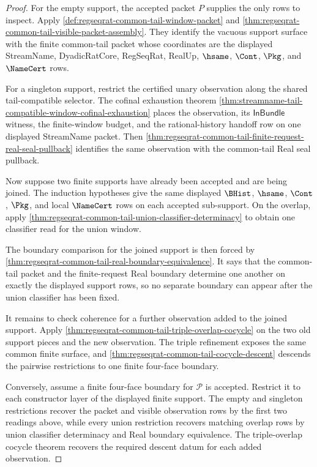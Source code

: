 \begin{proof}
For the empty support, the accepted packet $P$ supplies the only rows to inspect. Apply \autoref{def:regseqrat-common-tail-window-packet} and \autoref{thm:regseqrat-common-tail-visible-packet-assembly}. They identify the vacuous support surface with the finite common-tail packet whose coordinates are the displayed StreamName, DyadicRatCore, RegSeqRat, RealUp, $\hsame$, $\Cont$, $\Pkg$, and $\NameCert$ rows.

For a singleton support, restrict the certified unary observation along the shared tail-compatible selector. The cofinal exhaustion theorem \autoref{thm:streamname-tail-compatible-window-cofinal-exhaustion} places the observation, its $\mathsf{InBundle}$ witness, the finite-window budget, and the rational-history handoff row on one displayed StreamName packet. Then \autoref{thm:regseqrat-common-tail-finite-request-real-seal-pullback} identifies the same observation with the common-tail Real seal pullback.

Now suppose two finite supports have already been accepted and are being joined. The induction hypotheses give the same displayed $\BHist$, $\hsame$, $\Cont$, $\Pkg$, and local $\NameCert$ rows on each accepted sub-support. On the overlap, apply \autoref{thm:regseqrat-common-tail-union-classifier-determinacy} to obtain one classifier read for the union window.

The boundary comparison for the joined support is then forced by \autoref{thm:regseqrat-common-tail-real-boundary-equivalence}. It says that the common-tail packet and the finite-request Real boundary determine one another on exactly the displayed support rows, so no separate boundary can appear after the union classifier has been fixed.

It remains to check coherence for a further observation added to the joined support. Apply \autoref{thm:regseqrat-common-tail-triple-overlap-cocycle} on the two old support pieces and the new observation. The triple refinement exposes the same common finite surface, and \autoref{thm:regseqrat-common-tail-cocycle-descent} descends the pairwise restrictions to one finite four-face boundary.

Conversely, assume a finite four-face boundary for $\mathcal P$ is accepted. Restrict it to each constructor layer of the displayed finite support. The empty and singleton restrictions recover the packet and visible observation rows by the first two readings above, while every union restriction recovers matching overlap rows by union classifier determinacy and Real boundary equivalence. The triple-overlap cocycle theorem recovers the required descent datum for each added observation.


\end{proof}

